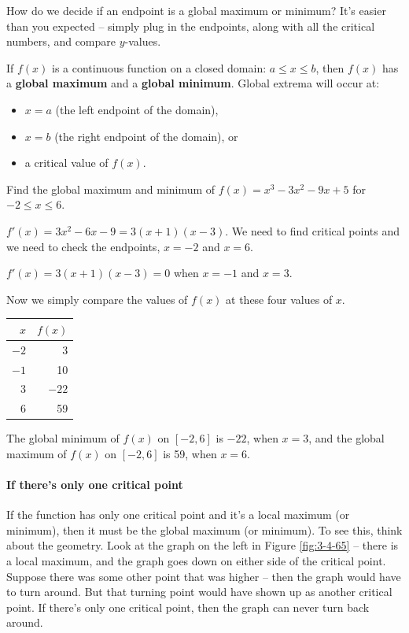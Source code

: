 How do we decide if an endpoint is a global maximum or minimum? It's easier than you expected -- simply plug in the endpoints, along with all the critical numbers, and compare $y$-values.

\begin{theorem}
If $f(x)$ is a continuous function on a closed domain: $a\le x\le b$, then $f(x)$ has a {\bf global maximum} and a {\bf global minimum}. Global extrema will occur at:
    \begin{itemize}
    \item $x=a$ (the left endpoint of the domain),
    \item $x=b$ (the right endpoint of the domain), or
    \item a critical value of $f(x)$.
    \end{itemize}
\end{theorem}

\begin{example}
Find the global maximum and minimum of $f(x)=x^3-3x^2-9x+5$ for $-2\le x\le 6$.

\begin{solution} $f'(x)=3x^2-6x-9=3(x+1)(x-3)$. We need to find critical points and we need to check the endpoints, $x=-2$ and $x=6$.

$f'(x)=3(x+1)(x-3)=0$ when $x=-1$ and $x=3$.

Now we simply compare the values of $f(x)$ at these four values of $x$.

\begin{center}
\begin{tabular}{rr}
\toprule
$x$     & $f(x)$ \\
\midrule
$-2$    &    3 \\
$-1$    &	10	\\
3       &	$-22$ \\
6       &	59 \\
\bottomrule
\end{tabular}
\end{center}

The global minimum of $f(x)$ on $[-2,6]$ is $-22$, when $x=3$, and the global maximum of $f(x)$ on $[-2,6]$ is 59, when $x=6$.
\end{solution}
\end{example}

\paragraph*{If there's only one critical point}
If the function has only one critical point and it's a local maximum (or minimum), then it must be the global maximum (or minimum). To see this, think about the geometry. Look at the graph on the left in Figure \ref{fig:3-4-65} -- there is a local maximum, and the graph goes down on either side of the critical point. Suppose there was some other point that was higher -- then the graph would have to turn around. But that turning point would have shown up as another critical point. If there's only one critical point, then the graph can never turn back around.

